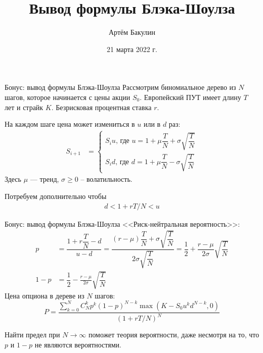 \documentclass[pdf,12pt]{beamer}
\title{Вывод формулы Блэка-Шоулза}
\author{Артём Бакулин}
\date{21 марта 2022 г.}
\begin{document}
\begin{frame}
\titlepage
\end{frame}

\begin{frame}{Бонус: вывод формулы Блэка-Шоулза}
\justify
Рассмотрим биномиальное дерево из $N$ шагов, которое начинается с цены акции $S_0$. Европейский ПУТ имеет длину $T$ лет и страйк $K$. Безрисковая процентная ставка $r$.

\vspace{\baselineskip}
На каждом шаге цена может измениться в $u$ или в $d$ раз:
\begin{align*}
S_{i+1} &= \begin{cases}
S_iu\text{, где } u = 1 + \mu \dfrac{T}{N} + \sigma\sqrt{\dfrac{T}{N}} \\
S_id\text{, где } d = 1 + \mu \dfrac{T}{N} - \sigma\sqrt{\dfrac{T}{N}}\end{cases}
\end{align*}
Здесь $\mu$ --- тренд, $\sigma \ge 0$ -- волатильность.
\vspace{\baselineskip}

Потребуем дополнительно чтобы
\begin{align*}
d < 1+rT/N < u
\end{align*}
\end{frame}

\begin{frame}{Бонус: вывод формулы Блэка-Шоулза}
<<Риск-нейтральная вероятность>>:
\begin{align*}
p &= \dfrac{1+r\dfrac{T}{N} - d}{u - d} = \dfrac{\left(r-\mu\right)\dfrac{T}{N} + \sigma\sqrt{\dfrac{T}{N}}}{2\sigma\sqrt{\dfrac{T}{N}}} 
= \dfrac{1}{2} + \dfrac{r -\mu}{2\sigma}\sqrt{\dfrac{T}{N}} \\
1-p &= \dfrac{1}{2} - \frac{r -\mu}{2\sigma}\sqrt{\dfrac{T}{N}}
\end{align*}
Цена опциона в дереве из $N$ шагов:
\begin{equation*}
P = \dfrac{\sum\limits_{k=0}^{N} C^k_Np^k(1-p)^{N-k}\max(K - S_0u^kd^{N-k},0)}{\left(1+rT/N \right)^N}
\end{equation*}

\justify
Найти предел при $N \to \infty$ поможет теория вероятности, даже несмотря на то, что $p$ и $1-p$ не являются вероятностями.
\end{frame}
\end{document}
